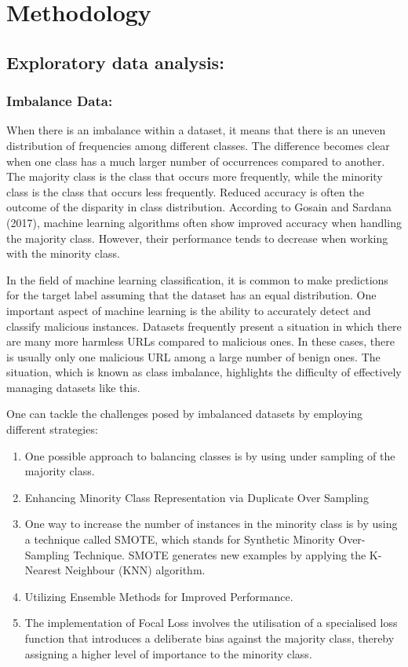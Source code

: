 \def\baselinestretch{1}
\chapter{Methodology}

\section{Exploratory data analysis:}
\subsection{Imbalance Data:}


When there is an imbalance within a dataset, it means that there is an uneven distribution of frequencies among different classes. The difference becomes clear when one class has a much larger number of occurrences compared to another. The majority class is the class that occurs more frequently, while the minority class is the class that occurs less frequently. Reduced accuracy is often the outcome of the disparity in class distribution. According to Gosain and Sardana (2017), machine learning algorithms often show improved accuracy when handling the majority class. However, their performance tends to decrease when working with the minority class.

In the field of machine learning classification, it is common to make predictions for the target label assuming that the dataset has an equal distribution. One important aspect of machine learning is the ability to accurately detect and classify malicious instances.\cite{shelke2017review} Datasets frequently present a situation in which there are many more harmless URLs compared to malicious ones. In these cases, there is usually only one malicious URL among a large number of benign ones. The situation, which is known as class imbalance, highlights the difficulty of effectively managing datasets like this\cite{shelke2017review}.

One can tackle the challenges posed by imbalanced datasets by employing different strategies:
\begin{enumerate}
	\item One possible approach to balancing classes is by using under sampling of the majority class.
	\item Enhancing Minority Class Representation via Duplicate Over Sampling 
	\item One way to increase the number of instances in the minority class is by using a technique called SMOTE, which stands for Synthetic Minority Over-Sampling Technique. SMOTE generates new examples by applying the K-Nearest Neighbour (KNN) algorithm.
	\item Utilizing Ensemble Methods for Improved Performance.
	\item The implementation of Focal Loss involves the utilisation of a specialised loss function that introduces a deliberate bias against the majority class, thereby assigning a higher level of importance to the minority class. 
\end{enumerate}

